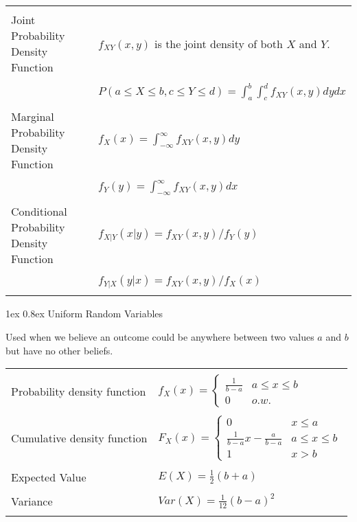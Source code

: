\documentclass[10pt,landscape]{article}
\makeatletter
\renewcommand{\subsection}{\@startsection{subsection}{2}{0mm}%
                                {1ex} %
                                {0.8ex} %
                                {\normalfont\normalsize\bfseries}}
\makeatother
\begin{document}
\begin{multicols}{2}
\begin{tabular}{@{}ll@{}}
        & \\
   Joint Probability Density Function & $f_{XY}(x, y)$ is the joint density of both $X$ and $Y$. \\
        & \\
                              & $ P(a \le X \le b, c \le Y \le d) = \int_{a}^{b} \int_{c}^{d} f_{XY}(x,y) dy dx $\\
        & \\
   Marginal Probability Density Function & $f_X(x) = \int_{-\infty}^{\infty} f_{XY}(x,y) dy$ \\
        & \\
                                         & $f_Y(y) = \int_{-\infty}^{\infty} f_{XY}(x,y) dx$ \\
        & \\
   Conditional Probability Density Function & $f_{X|Y}(x|y) = f_{XY}(x,y)/f_{Y}(y)$ \\
        & \\
                                    & $f_{Y|X}(y|x) = f_{XY}(x,y)/f_{X}(x)$ \\
        & \\
\end{tabular}

\subsection{Uniform Random Variables}

Used when we believe an outcome could be anywhere between two values
\(a\) and \(b\) but have no other beliefs.

\begin{tabular}{@{}ll@{}}
        & \\
   Probability density function & $f_X(x) = \begin{cases} \frac{1}{b-a} & a \le x \le b \\ 0 & o.w. \end{cases}$ \\
        & \\
      Cumulative density function & $F_X(x) = \begin{cases} 0 & x \le a \\ \frac{1}{b-a} x - \frac{a}{b-a} & a \le x \le b \\ 1 & x > b \end{cases}$ \\
        & \\
      Expected Value & $E(X) = \frac{1}{2}(b+a)$ \\
        & \\
      Variance & $Var(X) = \frac{1}{12}(b-a)^2$ \\
        & \\
\end{tabular}


\end{multicols}
\end{document}
